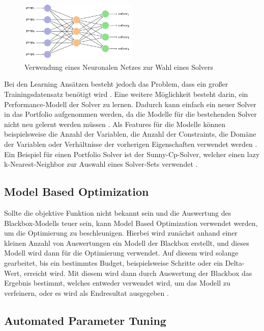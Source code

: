 \begin{figure}[h]
    \centering
    \includegraphics[width=0.5\textwidth]{figures/Neuronal Nework to choose Solver [popes22jo].PNG}
    \caption{Verwendung eines Neuronalen Netzes zur Wahl eines Solvers
    \cite[105]{popes22jo}}
    \label{fig:bild}
\end{figure}

Bei den Learning Ansätzen besteht jedoch das Problem, dass ein großer
Trainingsdatensatz benötigt wird \cite[15-16]{kotth12jo}. Eine weitere
Möglichkeit besteht darin, ein Performance-Modell der Solver zu lernen. Dadurch
kann einfach ein neuer Solver in das Portfolio aufgenommen werden, da die
Modelle für die bestehenden Solver nicht neu gelernt werden müssen
\cite[18]{kotth12jo}. Als Features für die Modelle können beispielsweise die
Anzahl der Variablen, die Anzahl der Constraints, die Domäne der Variablen oder
Verhältnisse der vorherigen Eigenschaften verwendet werden \cite[22]{kotth12jo}.
Ein Beispiel für einen Portfolio Solver ist der Sunny-Cp-Solver, welcher einen
lazy k-Nearest-Neighbor zur Auswahl eines Solver-Sets verwendet
\cite[4]{amadi15jo}.


\subsection{Model Based Optimization}
\label{sec:Model-Based-Optimization}

Sollte die objektive Funktion nicht bekannt sein und die Auswertung des
Blackbox-Modells teuer sein, kann Model Based Optimization verwendet werden, um
die Optimierung zu beschleunigen. Hierbei wird zunächst anhand einer kleinen
Anzahl von Auswertungen ein Modell der Blackbox erstellt, und dieses Modell wird
dann für die Optimierung verwendet. Auf diesem wird solange gearbeitet, bis ein
bestimmtes Budget, beispielsweise Schritte oder ein Delta-Wert, erreicht wird.
Mit diesem wird dann durch Auswertung der Blackbox das Ergebnis bestimmt,
welches entweder verwendet wird, um das Modell zu verfeinern, oder es wird als
Endresultat ausgegeben \cite[4]{bisch18pr}.


\subsection{Automated Parameter Tuning}
\label{sec:Automated-Parameter-Tuning}

